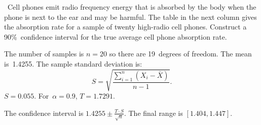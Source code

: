 \begin{problem}
  ~Cell phones emit radio frequency energy that is absorbed by the body when the phone is next to the ear and may be harmful.  The table in the next column gives the absorption rate for a sample of twenty high-radio cell phones.  Construct a 90\%~confidence interval for the true average cell phone absorption rate.
\end{problem}

The number of samples is ${n=20}$ so there are 19~degrees of freedom.  The mean is~1.4255.  The sample standard deviation is:
\begin{equation}\label{eq:SampleStdDev}
  S = \sqrt{\frac{\sum_{i=1}^{n} (X_i - \bar{X})}{n - 1}}\text{.}
\end{equation}
\noindent
${S = 0.055}$. For~${\alpha = 0.9}$, ${T = 1.7291}$.

The confidence interval is ${1.4255 \pm \frac{T \cdot S}{\sqrt{n}}}$.  The final range is ${[1.404,1.447]}$.
